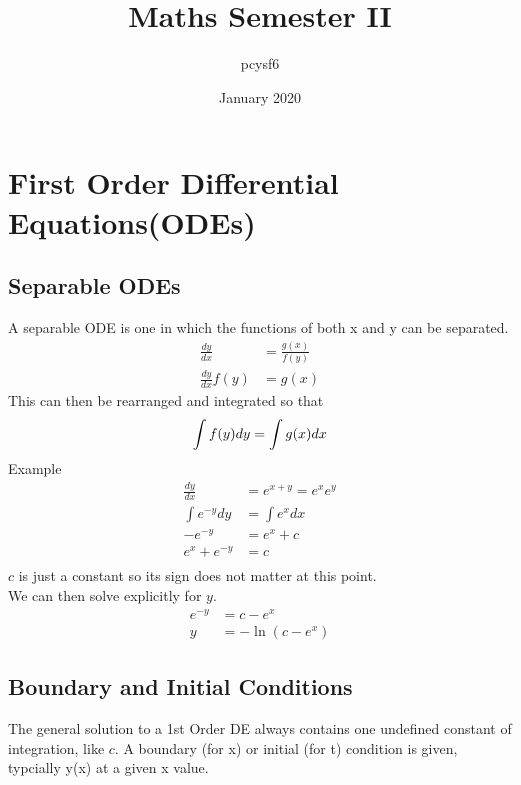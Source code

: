 \documentclass{article}
\title{Maths Semester II}
\author{pcysf6 }
\date{January 2020}
\begin{document}
\maketitle

\section{First Order Differential Equations(ODEs)}
\subsection{Separable ODEs}
A separable ODE is one in which the functions of both x and y can be separated.
\begin{align*}
    \frac{dy}{dx} &= \frac{g(x)}{f(y)} \\
    \frac{dy}{dx} f(y) &= g(x)
\end{align*}
This can then be rearranged and integrated so that
$$\int f(y) dy = \int g(x) dx\\$$
\textrm{Example}
\begin{align*}
    \frac{dy}{dx} &= e^{x+y} = e^xe^y\\
    \int e^{-y} dy &= \int e^x dx\\
    -e^{-y} &= e^x + c\\
    e^x + e^{-y} &= c\\
\end{align*}
$c$ is just a constant so its sign does not matter at this point.\\
We can then solve explicitly for $y$. 
\begin{align*}
    e^{-y} &= c - e^x\\
    y &= -\ln(c-e^x)
\end{align*}
\newpage

\subsection{Boundary and Initial Conditions}
The general solution to a 1st Order DE always contains one undefined constant of integration, like $c$. 
A boundary (for x) or initial (for t) condition is given, typcially y(x) at a given x value.
\end{document}
